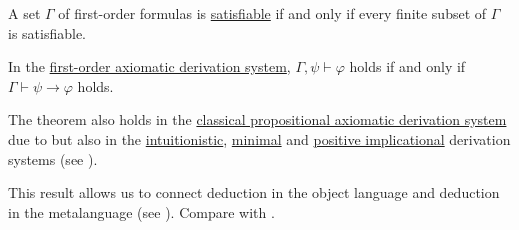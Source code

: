 \smallskip

\begin{corollary}\label{thm:first_order_compactness_theorem}
  A set \( \Gamma \) of first-order formulas is \hyperref[def:propositional_semantics/satisfiability]{satisfiable} if and only if every finite subset of \( \Gamma \) is satisfiable.
\end{corollary}

\begin{theorem}\label{thm:syntactic_deduction_theorem}
  In the \hyperref[def:minimal_propositional_axiomatic_derivation_system]{first-order axiomatic derivation system}, \( \Gamma, \psi \vdash \varphi \) holds if and only if \( \Gamma \vdash \psi \rightarrow \varphi \) holds.

  The theorem also holds in the \hyperref[def:propositional_axiomatic_derivation_system]{classical propositional axiomatic derivation system} due to  but also in the \hyperref[def:intuitionistic_propositional_axiomatic_derivation_system]{intuitionistic}, \hyperref[def:intuitionistic_propositional_axiomatic_derivation_system]{minimal} and \hyperref[def:positive_implicational_propositional_derivation_system]{positive implicational} derivation systems (see ).

  This result allows us to connect deduction in the object language and deduction in the metalanguage (see ). Compare with .
\end{theorem}

